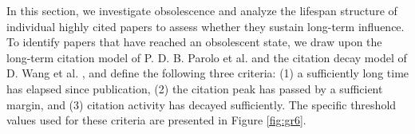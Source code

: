 In this section, we investigate obsolescence and analyze the lifespan structure of individual highly cited papers to assess whether they sustain long-term influence. To identify papers that have reached an obsolescent state, we draw upon the long-term citation model of P. D. B. Parolo et al. \cite{Par1} and the citation decay model of D. Wang et al. \cite{Wan1}, and define the following three criteria: (1) a sufficiently long time has elapsed since publication, (2) the citation peak has passed by a sufficient margin, and (3) citation activity has decayed sufficiently. The specific threshold values used for these criteria are presented in Figure \ref{fig:gr6}.
